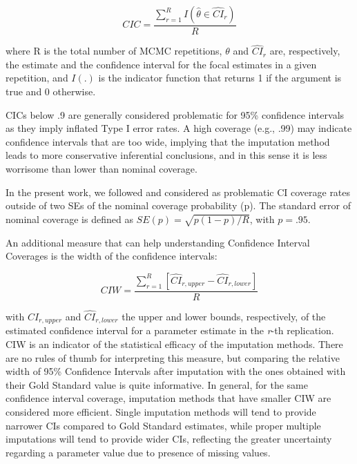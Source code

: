 	\begin{equation} \label{eqn:cic}
		CIC =  \frac{ \sum_{r=1}^{R} I(\hat{\theta} \in \widehat{CI}_r ) }{R}
	\end{equation}

	where R is the total number of MCMC repetitions, 
	$\theta$ and $\hat{CI}_r$ are, respectively, the estimate and the confidence interval for the focal estimates 
	in a given repetition, 
	and $I(.)$ is the indicator function that returns 1 if the argument is true and 0 otherwise.

	CICs below .9 are generally considered problematic for 95\% confidence intervals \cite[p. 52]{vanBuuren:2018} 
	as they imply inflated Type I error rates.
	A high coverage (e.g., .99) may indicate confidence intervals that are too wide, implying that
	the imputation method leads to more conservative inferential conclusions, and in this sense it is less worrisome 
	than lower than nominal coverage.

	In the present work, we followed \cite{burtonEtAl:2006} and considered as problematic CI coverage rates
	outside of two SEs of the nominal coverage probability (p).
	The standard error of nominal coverage is defined as $SE(p) = \sqrt{p (1-p)/R}$, with $p = .95$.

	An additional measure that can help understanding Confidence Interval Coverages is the width of the confidence
	intervals:

	\begin{equation} \label{eqn:ciw}
		CIW =  \frac{ \sum_{r=1}^{R} [\widehat{CI}_{r,upper} - \widehat{CI}_{r,lower}] }{R}
	\end{equation}

	with $\widehat{CI}_{r,upper}$ and $\widehat{CI}_{r,lower}$ the upper and lower bounds, respectively, 
	of the estimated confidence interval for a parameter estimate in the \emph{r}-th replication.
	CIW is an indicator of the statistical efficacy of the imputation methods.
	There are no rules of thumb for interpreting this measure, but comparing the relative width of 95\%
	Confidence Intervals after imputation with the ones obtained with their Gold Standard value is quite 
	informative.
	In general, for the same confidence interval coverage, imputation methods that have smaller CIW are
	considered more efficient.
	Single imputation methods will tend to provide narrower CIs compared to Gold Standard estimates, while proper 
	multiple imputations will tend to provide wider CIs, reflecting the greater uncertainty regarding a 
	parameter value due to presence of missing values.

